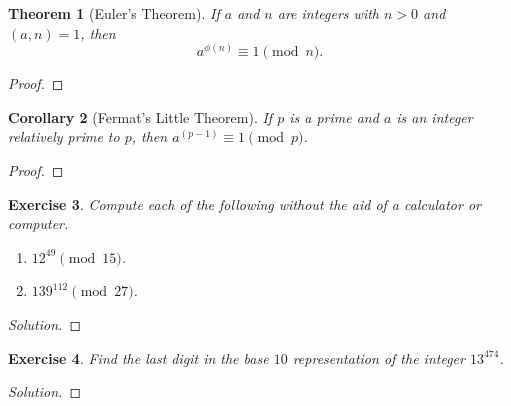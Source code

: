 \documentclass[12pt,leqno]{article}
\numberwithin{equation}{section}
\newtheorem{thm}{Theorem}[section]
\newtheorem{cor}[thm]{Corollary}
\newtheorem{exer}[thm]{Exercise}
\theoremstyle{definition}
\begin{document}
\begin{thm}[Euler's Theorem]
If $a$ and $n$ are integers with $n > 0$ and $(a, n) = 1$, then \[
a^{\phi(n)} \equiv 1 \pmod{n}. \]
\end{thm}
\begin{proof}[Proof]
\end{proof}

\begin{cor}[Fermat's Little Theorem]
If $p$ is a prime and $a$ is an integer relatively prime to $p$,
then $a^{(p-1)} \equiv 1 \pmod{p}$.
\end{cor}
\begin{proof}[Proof]
\end{proof}


\begin{exer}
Compute each of the following without the aid of a calculator or
computer.
\begin{enumerate}
\item $12^{49} \pmod{15}$.
\item $139^{112} \pmod{27}$.
\end{enumerate}
\end{exer}
\begin{proof}[Solution]
\end{proof}

\begin{exer}
Find the last digit in the base $10$ representation of the integer
$13^{474}$.
\end{exer}
\begin{proof}[Solution]
\end{proof}
\end{document}
